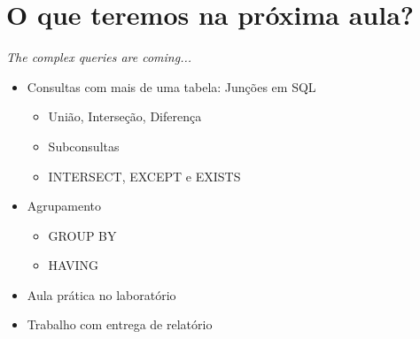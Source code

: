 \documentclass[aspectratio=169]{beamer}
\begin{document}
		\section{O que teremos na próxima aula?}
			\begin{frame}{\textit{The complex queries are coming...}}
				\begin{itemize}
					\item Consultas com mais de uma tabela: Junções em SQL
					\begin{itemize}
						\item União, Interseção, Diferença
						\item Subconsultas
						\item INTERSECT, EXCEPT e EXISTS
					\end{itemize}
					\item Agrupamento
						\begin{itemize}
							\item GROUP BY
							\item HAVING
						\end{itemize}
					\item Aula prática no laboratório
					\item Trabalho com entrega de relatório
				\end{itemize}
			\end{frame}
\end{document}
